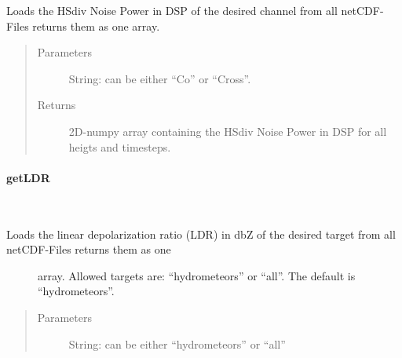 \documentclass[letterpaper,10pt,english]{sphinxmanual}
\begin{document}
\begin{fulllineitems}
\begin{fulllineitems}
\label{\detokenize{generated/MPPy.Instruments.Radar.Radar.getNoisePower:MPPy.Instruments.Radar.Radar.getNoisePower}}
Loads the HSdiv Noise Power in DSP of the desired channel from all netCDF-Files returns them as one array.
\begin{quote}\begin{description}
\item[{Parameters}] \leavevmode
{} \textendash{} String: can be either “Co” or “Cross”.

\item[{Returns}] \leavevmode
2D-numpy array containing the HSdiv Noise Power in DSP for all heigts and timesteps.

\end{description}\end{quote}

\end{fulllineitems}



\paragraph{getLDR}
\label{\detokenize{generated/MPPy.Instruments.Radar.Radar.getLDR:getldr}}\label{\detokenize{generated/MPPy.Instruments.Radar.Radar.getLDR::doc}}

\begin{fulllineitems}
\label{\detokenize{generated/MPPy.Instruments.Radar.Radar.getLDR:MPPy.Instruments.Radar.Radar.getLDR}}~\begin{description}
\item[{Loads the linear depolarization ratio (LDR) in dbZ of the desired target from all netCDF-Files returns them as one}] \leavevmode
array. Allowed targets are: “hydrometeors” or “all”. The default is “hydrometeors”.

\end{description}
\begin{quote}\begin{description}
\item[{Parameters}] \leavevmode
{} \textendash{} String: can be either “hydrometeors” or “all”


\end{description}
\end{quote}
\end{fulllineitems}
\end{fulllineitems}
\end{document}
